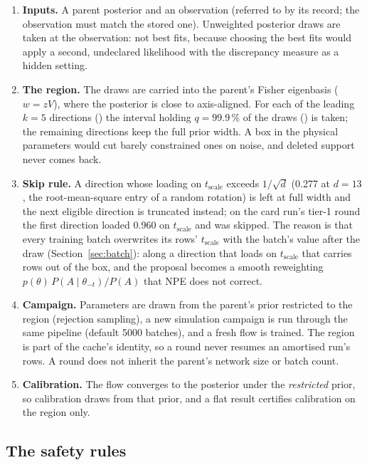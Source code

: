 \documentclass[10pt,a4paper]{article}
\newcommand{\code}[1]{\texttt{\detokenize{#1}}}
\newcommand{\tscale}{t_{\mathrm{scale}}}
\begin{document}
\begin{enumerate}[leftmargin=1.6em,itemsep=2pt]
  \item \textbf{Inputs.} A parent posterior and an observation (referred to by its record; the observation must match the
        stored one). Unweighted posterior draws are taken at the observation: not best fits, because choosing the best
        fits would apply a second, undeclared likelihood with the discrepancy measure as a hidden setting.
  \item \textbf{The region.} The draws are carried into the parent's Fisher eigenbasis ($w=zV$), where the posterior is
        close to axis-aligned. For each of the leading $k=5$ directions (\code{--directions}) the interval holding
        $q=99.9\,\%$ of the draws (\code{--level}) is taken; the remaining directions keep the full prior width. A box in the
        physical parameters would cut barely constrained ones on noise, and deleted support never comes back.
  \item \textbf{Skip rule.} A direction whose loading on $\tscale$ exceeds $1/\sqrt d$ (0.277 at $d=13$, the root-mean-square
        entry of a random rotation) is left at full width and the next eligible direction is truncated instead; on the
        card run's tier-1 round the first direction loaded 0.960 on $\tscale$ and was skipped. The reason is that every
        training batch overwrites its rows' $\tscale$ with the batch's value after the draw (Section~\ref{sec:batch}): along
        a direction that loads on $\tscale$ that carries rows out of the box, and the proposal becomes a smooth reweighting
        $p(\theta)\,P(A\mid\theta_{-t})/P(A)$ that NPE does not correct.
  \item \textbf{Campaign.} Parameters are drawn from the parent's prior restricted to the region (rejection sampling), a new
        simulation campaign is run through the same pipeline (default 5000 batches), and a fresh flow is trained. The region
        is part of the cache's identity, so a round never resumes an amortised run's rows. A round does not inherit the
        parent's network size or batch count.
  \item \textbf{Calibration.} The flow converges to the posterior under the \emph{restricted} prior, so calibration draws from
        that prior, and a flat result certifies calibration on the region only.
\end{enumerate}

\subsection{The safety rules}
\end{document}
